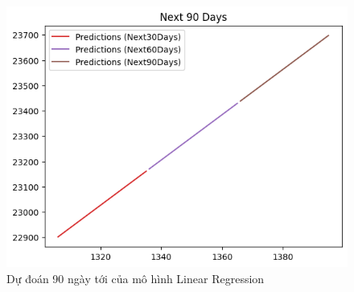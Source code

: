 \begin{figure}[H]
\begin{minipage}{0.15\textwidth}
    \includegraphics[width=1\textwidth]{resources/chapter-5/newdata1/predicted/EIB_LinearRegression_9-1_90Days.png}
    \end{minipage}
    \hfill
    
    \caption{Dự đoán 90 ngày tới của mô hình Linear Regression}
    \label{fig:linear_regression_predicted}
\end{figure}


